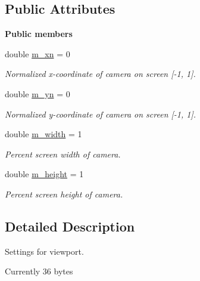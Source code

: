 \subsection*{Public Attributes}
\begin{Indent}\textbf{ Public members}\par
\begin{DoxyCompactItemize}
\item 
double \mbox{\hyperlink{classrev_1_1_viewport_aa2800b651ac224ff1c5142b79bedcb18}{m\+\_\+xn}} = 0
\begin{DoxyCompactList}\small\item\em Normalized x-\/coordinate of camera on screen \mbox{[}-\/1, 1\mbox{]}. \end{DoxyCompactList}\item 
double \mbox{\hyperlink{classrev_1_1_viewport_a2f7f203e1175985f91f10b479b03fb22}{m\+\_\+yn}} = 0
\begin{DoxyCompactList}\small\item\em Normalized y-\/coordinate of camera on screen \mbox{[}-\/1, 1\mbox{]}. \end{DoxyCompactList}\item 
\mbox{\label{classrev_1_1_viewport_af824d048e25744148390baf1ef5d6439}} 
double \mbox{\hyperlink{classrev_1_1_viewport_af824d048e25744148390baf1ef5d6439}{m\+\_\+width}} = 1
\begin{DoxyCompactList}\small\item\em Percent screen width of camera. \end{DoxyCompactList}\item 
\mbox{\label{classrev_1_1_viewport_aa5626d213293db093c3ae20e34f22304}} 
double \mbox{\hyperlink{classrev_1_1_viewport_aa5626d213293db093c3ae20e34f22304}{m\+\_\+height}} = 1
\begin{DoxyCompactList}\small\item\em Percent screen height of camera. \end{DoxyCompactList}\end{DoxyCompactItemize}
\end{Indent}


\subsection{Detailed Description}
Settings for viewport. 

Currently 36 bytes 

